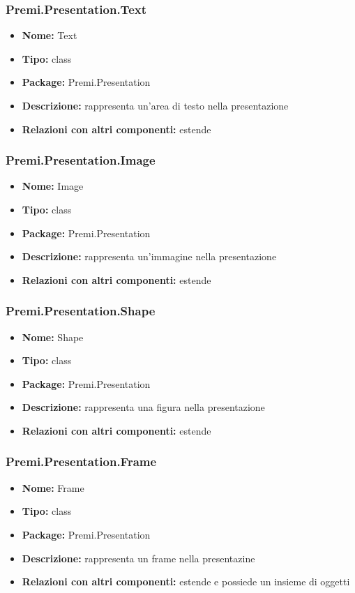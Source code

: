 \subsubsection{Premi.Presentation.Text}
\begin{itemize}
  \item \textbf{Nome:} Text
  \item \textbf{Tipo:} class
  \item \textbf{Package:} Premi.Presentation
  \item \textbf{Descrizione:} rappresenta un'area di testo nella presentazione
    \item \textbf{Relazioni con altri componenti:} estende 
\end{itemize}
\subsubsection{Premi.Presentation.Image}
\begin{itemize}
  \item \textbf{Nome:} Image
  \item \textbf{Tipo:} class
  \item \textbf{Package:} Premi.Presentation
  \item \textbf{Descrizione:} rappresenta un'immagine nella presentazione
      \item \textbf{Relazioni con altri componenti:} estende 
\end{itemize}
\subsubsection{Premi.Presentation.Shape}
\begin{itemize}
  \item \textbf{Nome:} Shape
  \item \textbf{Tipo:} class
  \item \textbf{Package:} Premi.Presentation
  \item \textbf{Descrizione:} rappresenta una figura nella presentazione
      \item \textbf{Relazioni con altri componenti:} estende 
\end{itemize}
\subsubsection{Premi.Presentation.Frame}
\begin{itemize}
  \item \textbf{Nome:} Frame
  \item \textbf{Tipo:} class
  \item \textbf{Package:} Premi.Presentation
  \item \textbf{Descrizione:} rappresenta un frame nella presentazine
  \item \textbf{Relazioni con altri componenti:} estende  e possiede un insieme di oggetti  
\end{itemize}
